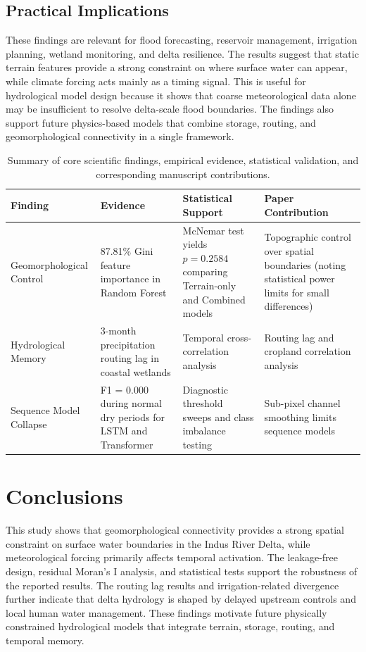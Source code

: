 \documentclass[12pt, a4paper]{article}
\begin{document}
\subsection{Practical Implications}
These findings are relevant for flood forecasting, reservoir management, irrigation planning, wetland monitoring, and delta resilience. The results suggest that static terrain features provide a strong constraint on where surface water can appear, while climate forcing acts mainly as a timing signal. This is useful for hydrological model design because it shows that coarse meteorological data alone may be insufficient to resolve delta-scale flood boundaries. The findings also support future physics-based models that combine storage, routing, and geomorphological connectivity in a single framework.

\begin{table}[t]
\caption{Summary of core scientific findings, empirical evidence, statistical validation, and corresponding manuscript contributions.}
\label{tab:contribution_summary}
\centering
\small
\begin{tabular}{p{2.8cm} p{2.8cm} p{4.0cm} p{2.8cm}}
\hline
\textbf{Finding} & \textbf{Evidence} & \textbf{Statistical Support} & \textbf{Paper Contribution} \\
\hline
Geomorphological Control & 87.81\% Gini feature importance in Random Forest & McNemar test yields $p = 0.2584$ comparing Terrain-only and Combined models & Topographic control over spatial boundaries (noting statistical power limits for small differences) \\
\hline
Hydrological Memory & 3-month precipitation routing lag in coastal wetlands & Temporal cross-correlation analysis & Routing lag and cropland correlation analysis \\
\hline
Sequence Model Collapse & F1 = 0.000 during normal dry periods for LSTM and Transformer & Diagnostic threshold sweeps and class imbalance testing & Sub-pixel channel smoothing limits sequence models \\
\hline
\end{tabular}
\end{table}



\section{Conclusions}
This study shows that geomorphological connectivity provides a strong spatial constraint on surface water boundaries in the Indus River Delta, while meteorological forcing primarily affects temporal activation. The leakage-free design, residual Moran’s I analysis, and statistical tests support the robustness of the reported results. The routing lag results and irrigation-related divergence further indicate that delta hydrology is shaped by delayed upstream controls and local human water management. These findings motivate future physically constrained hydrological models that integrate terrain, storage, routing, and temporal memory.
\end{document}
